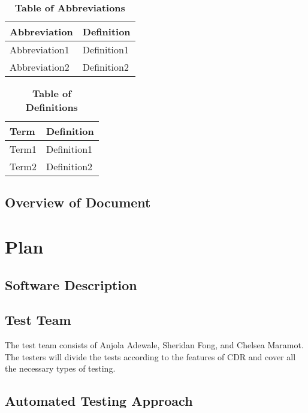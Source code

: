 \documentclass[12pt, titlepage]{article}
\begin{document}
\begin{table}[hbp]
\caption{\textbf{Table of Abbreviations}} \label{Table}

\begin{tabularx}{\textwidth}{p{3cm}X}
\toprule
\textbf{Abbreviation} & \textbf{Definition} \\
\midrule
Abbreviation1 & Definition1\\
Abbreviation2 & Definition2\\
\bottomrule
\end{tabularx}

\end{table}

\begin{table}[!htbp]
\caption{\textbf{Table of Definitions}} \label{Table}

\begin{tabularx}{\textwidth}{p{3cm}X}
\toprule
\textbf{Term} & \textbf{Definition}\\
\midrule
Term1 & Definition1\\
Term2 & Definition2\\
\bottomrule
\end{tabularx}

\end{table}	

\subsection{Overview of Document}

\section{Plan}
	
\subsection{Software Description}

\subsection{Test Team}

The test team consists of Anjola Adewale, Sheridan Fong, and Chelsea Maramot. The testers will divide the tests according to the features of CDR and cover all the necessary types of testing.

\subsection{Automated Testing Approach}
\end{document}
